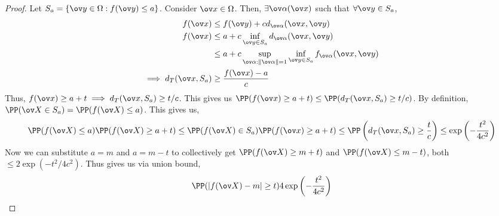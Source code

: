 \begin{proof}
Let $S_a = \{\ov y \in \Omega: f(\ov y) \leq a\}$. Consider $\ov x \in \Omega$. Then, $\exists \ov \alpha (\ov x) $ such that $\forall \ov y \in S_a$,
\begin{align*}
f(\ov x) &\leq f(\ov y) + cd_{\ov \alpha}(\ov x, \ov y) \\
f(\ov x) &\leq a + c \inf_{\ov y \in S_a} d_{\ov \alpha}(\ov x, \ov y) \\
&\leq a + c \sup_{\ov\alpha:\|\ov\alpha\|=1} \inf_{\ov y \in S_a} f_{\ov \alpha} (\ov x, \ov y) \\
\implies d_T(\ov x, S_a) &\geq \frac{f(\ov x) - a}{c}
\end{align*}
Thus, $f(\ov x) \geq a + t\implies d_T(\ov x, S_a) \geq t/c$. This gives us $\PP(f(\ov x) \geq a + t) \leq \PP(d_T(\ov x, S_a) \geq t/c)$. By definition, $\PP(\ov X \in S_a) = \PP(f(\ov X) \leq a)$.
This gives us,
\[
\PP(f(\ov X) \leq a) \PP(f(\ov X) \geq a + t) \leq \PP(f(\ov X) \in S_a) \PP(f(\ov x) \geq a + t) \leq \PP\left(d_T(\ov x, S_a) \geq \frac tc\right) \leq \exp\left(-\frac{t^2}{4c^2}\right)
\]
Now we can substitute $a = m$ and $a = m-t$ to collectively get $\PP(f(\ov X) \geq m+t)$ and $\PP(f(\ov X) \leq m-t)$, both $\leq 2\exp(-t^2/4c^2)$. Thus gives us via union bound,
\[
\PP(|f(\ov X) - m| \geq t) 4\exp\left(-\frac{t^2}{4c^2}\right)
\]
\end{proof}
